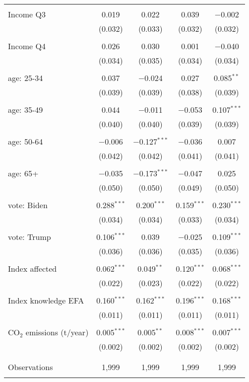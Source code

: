 \begin{tabular}{@{\extracolsep{5pt}}lcccc}
  & & & & \\ 
 Income Q3 & 0.019 & 0.022 & 0.039 & $-$0.002 \\ 
  & (0.032) & (0.033) & (0.032) & (0.032) \\ 
  & & & & \\ 
 Income Q4 & 0.026 & 0.030 & 0.001 & $-$0.040 \\ 
  & (0.034) & (0.035) & (0.034) & (0.034) \\ 
  & & & & \\ 
 age: 25-34 & 0.037 & $-$0.024 & 0.027 & 0.085$^{**}$ \\ 
  & (0.039) & (0.039) & (0.038) & (0.039) \\ 
  & & & & \\ 
 age: 35-49 & 0.044 & $-$0.011 & $-$0.053 & 0.107$^{***}$ \\ 
  & (0.040) & (0.040) & (0.039) & (0.039) \\ 
  & & & & \\ 
 age: 50-64 & $-$0.006 & $-$0.127$^{***}$ & $-$0.036 & 0.007 \\ 
  & (0.042) & (0.042) & (0.041) & (0.041) \\ 
  & & & & \\ 
 age: 65+ & $-$0.035 & $-$0.173$^{***}$ & $-$0.047 & 0.025 \\ 
  & (0.050) & (0.050) & (0.049) & (0.050) \\ 
  & & & & \\ 
 vote: Biden & 0.288$^{***}$ & 0.200$^{***}$ & 0.159$^{***}$ & 0.230$^{***}$ \\ 
  & (0.034) & (0.034) & (0.033) & (0.034) \\ 
  & & & & \\ 
 vote: Trump & 0.106$^{***}$ & 0.039 & $-$0.025 & 0.109$^{***}$ \\ 
  & (0.036) & (0.036) & (0.035) & (0.036) \\ 
  & & & & \\ 
 Index affected & 0.062$^{***}$ & 0.049$^{**}$ & 0.120$^{***}$ & 0.068$^{***}$ \\ 
  & (0.022) & (0.023) & (0.022) & (0.022) \\ 
  & & & & \\ 
 Index knowledge EFA & 0.160$^{***}$ & 0.162$^{***}$ & 0.196$^{***}$ & 0.168$^{***}$ \\ 
  & (0.011) & (0.011) & (0.011) & (0.011) \\ 
  & & & & \\ 
 CO$_{2}$ emissions (t/year) & 0.005$^{***}$ & 0.005$^{**}$ & 0.008$^{***}$ & 0.007$^{***}$ \\ 
  & (0.002) & (0.002) & (0.002) & (0.002) \\ 
  & & & & \\ 
\hline \\[-1.8ex] 

Observations & 1,999 & 1,999 & 1,999 & 1,999 \\ 
\hline 
\hline \\[-1.8ex] 
\end{tabular} 